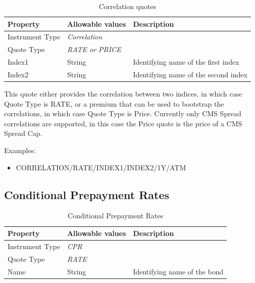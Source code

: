 \begin{table}[H]
\centering
  \begin{tabular}{|p{3cm}|p{3.5cm}|p{7cm}|}
  \hline
  {\bf Property} & {\bf Allowable values} & {\bf Description} \\ \hline
    Instrument Type & \emph{Correlation} & \\ \hline
    Quote Type & \emph{RATE or PRICE} & \\ \hline
    Index1 & String & Identifying name of the first index \\ \hline
    Index2 & String & Identifying name of the second index \\ \hline
  \end{tabular}
  \caption{Correlation quotes}
  \label{tab:correlation_quote}
\end{table}

This quote either provides the correlation between two indices, in which case Quote Type is RATE,
or a premium that can be used to bootstrap the correlations, in which case Quote Type is Price.
Currently only CMS Spread correlations are supported, in this case the Price quote is the price of a CMS Spread Cap.

\medskip
Examples:
\begin{itemize}
	\item CORRELATION/RATE/INDEX1/INDEX2/1Y/ATM
\end{itemize}

\subsection{Conditional Prepayment Rates}

\begin{table}[H]
\centering
  \begin{tabular}{|p{3cm}|p{3.5cm}|p{7cm}|}
  \hline
  {\bf Property} & {\bf Allowable values} & {\bf Description} \\ \hline
    Instrument Type & \emph{CPR} & \\ \hline
    Quote Type & \emph{RATE} & \\ \hline
    Name & String & Identifying name of the bond \\ \hline
  \end{tabular}
  \caption{Conditional Prepayment Rates}
  \label{tab:cpr_quote}
\end{table}

